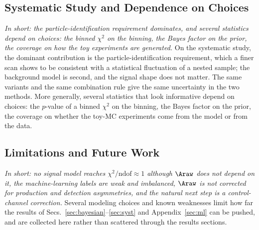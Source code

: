 \subsection{Systematic Study and Dependence on Choices}
\emph{In short: the particle-identification requirement dominates, and several statistics depend on choices: the binned $\chi^2$ on the binning, the Bayes factor on the prior, the coverage on how the toy experiments are generated.}
On the systematic study, the dominant contribution is the particle-identification requirement, which a finer scan shows to be consistent with a statistical fluctuation of a nested sample; the background model is second, and the signal shape does not matter. The same variants and the same combination rule give the same uncertainty in the two methods. More generally, several statistics that look informative depend on choices: the $p$-value of a binned $\chi^2$ on the binning, the Bayes factor on the prior, the coverage on whether the toy-MC experiments come from the model or from the data.

\subsection{Limitations and Future Work}
\label{sec:limitations}
\emph{In short: no signal model reaches $\chi^2/\mathrm{ndof}\approx1$ although $\Araw$ does not depend on it, the machine-learning labels are weak and imbalanced, $\Araw$ is not corrected for production and detection asymmetries, and the natural next step is a control-channel correction.}
Several modeling choices and known weaknesses limit how far the results of Secs.~\ref{sec:bayesian}--\ref{sec:syst} and Appendix~\ref{sec:ml} can be pushed, and are collected here rather than scattered through the results sections.

